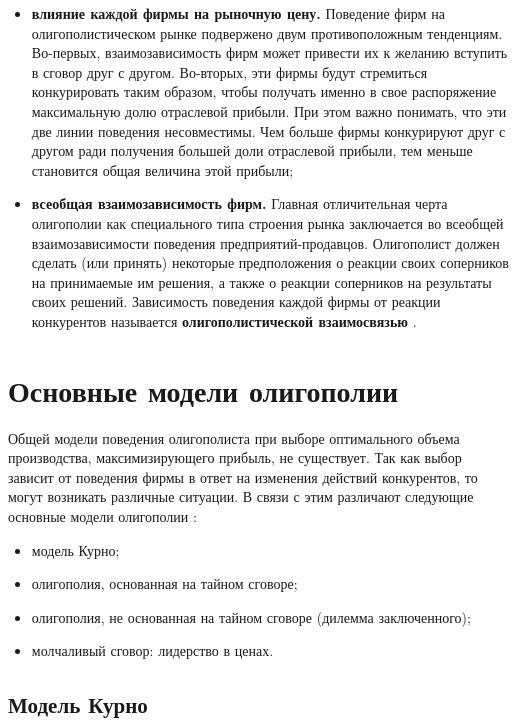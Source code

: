 \begin{itemize}
	\item \textbf{влияние каждой фирмы на рыночную цену.} Поведение фирм на олигополистическом рынке подвержено двум противоположным тенденциям. Во-первых, взаимозависимость фирм может привести их к желанию вступить в сговор друг с другом. Во-вторых, эти фирмы будут стремиться конкурировать таким образом, чтобы получать именно в свое распоряжение максимальную долю отраслевой прибыли. При этом важно понимать, что эти две линии поведения несовместимы. Чем больше фирмы конкурируют друг с другом ради получения большей доли отраслевой прибыли, тем меньше становится общая величина этой прибыли;
	
	\item \textbf{всеобщая взаимозависимость фирм.} Главная отличительная черта олигополии как специального типа строения рынка заключается во всеобщей взаимозависимости поведения предприятий-продавцов. Олигополист должен сделать (или принять) некоторые предположения о реакции своих соперников на принимаемые им решения, а также о реакции соперников на результаты своих решений. Зависимость
	поведения каждой фирмы от реакции конкурентов называется \textbf{олигополистической взаимосвязью} \cite{info_oly3}.
\end{itemize}

\section{Основные модели олигополии}

Общей модели поведения олигополиста при выборе оптимального объема производства, максимизирующего прибыль, не существует. 
Так как выбор зависит от поведения фирмы в ответ на изменения действий конкурентов, то могут возникать различные ситуации. 
В связи с этим различают следующие основные модели олигополии \cite{info_oly3}:

\begin{itemize}
	\item модель Курно;
	\item олигополия, основанная на тайном сговоре;
	
	\clearpage
	
	\item олигополия, не основанная на тайном сговоре (дилемма заключенного);
	\item молчаливый сговор: лидерство в ценах.
\end{itemize}

\subsection{Модель Курно}

